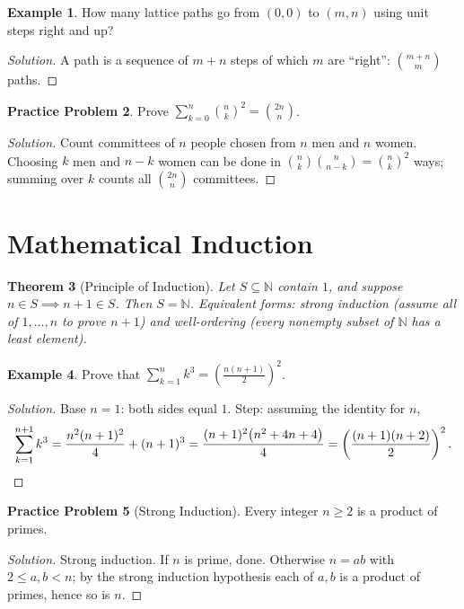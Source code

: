 \documentclass[11pt]{article}
\theoremstyle{plain}
\newtheorem{theorem}{Theorem}[section]
\theoremstyle{definition}
\newtheorem{example}[theorem]{Example}
\newtheorem{problem}[theorem]{Practice Problem}
\newenvironment{solution}{\begin{proof}[Solution]}{\end{proof}}
\newcommand{\NN}{\mathbb{N}}
\begin{document}
\begin{example}
How many lattice paths go from $(0,0)$ to $(m,n)$ using unit steps right and up?
\end{example}
\begin{solution}
A path is a sequence of $m+n$ steps of which $m$ are ``right'':
$\binom{m+n}{m}$ paths.
\end{solution}

\begin{problem}
Prove $\displaystyle\sum_{k=0}^{n} \binom{n}{k}^2 = \binom{2n}{n}$.
\end{problem}
\begin{solution}
Count committees of $n$ people chosen from $n$ men and $n$ women. Choosing
$k$ men and $n-k$ women can be done in $\binom nk\binom{n}{n-k} = \binom nk^2$
ways; summing over $k$ counts all $\binom{2n}{n}$ committees.
\end{solution}

\section{Mathematical Induction}

\begin{theorem}[Principle of Induction]
Let $S \subseteq \NN$ contain $1$, and suppose $n \in S \implies n+1 \in S$.
Then $S = \NN$. Equivalent forms: \emph{strong induction} (assume all of
$1,\dots,n$ to prove $n+1$) and \emph{well-ordering} (every nonempty subset of
$\NN$ has a least element).
\end{theorem}

\begin{example}
Prove that $\sum_{k=1}^{n} k^3 = \left(\frac{n(n+1)}{2}\right)^2$.
\end{example}
\begin{solution}
Base $n=1$: both sides equal $1$. Step: assuming the identity for $n$,
\[
\sum_{k=1}^{n+1}k^3 = \frac{n^2(n+1)^2}{4} + (n+1)^3
= \frac{(n+1)^2\bigl(n^2+4n+4\bigr)}{4} = \left(\frac{(n+1)(n+2)}{2}\right)^2.
\qedhere
\]
\end{solution}

\begin{problem}[Strong Induction]
Every integer $n \ge 2$ is a product of primes.
\end{problem}
\begin{solution}
Strong induction. If $n$ is prime, done. Otherwise $n = ab$ with
$2\le a,b < n$; by the strong induction hypothesis each of $a, b$ is a product
of primes, hence so is $n$.
\end{solution}
\end{document}
